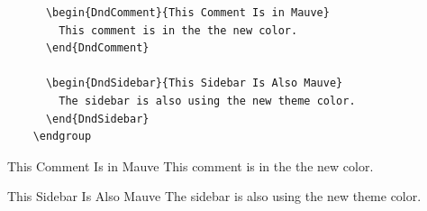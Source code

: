 \documentclass[letterpaper,openany,nodeprecatedcode]{dndbook}
\begin{document}
\begin{multicols}{2}
\begin{lstlisting}
      \begin{DndComment}{This Comment Is in Mauve}
        This comment is in the the new color.
      \end{DndComment}

      \begin{DndSidebar}{This Sidebar Is Also Mauve}
        The sidebar is also using the new theme color.
      \end{DndSidebar}
    \endgroup
  \end{lstlisting}

  \begingroup
    \DndSetThemeColor[PhbMauve]

    \begin{DndComment}{This Comment Is in Mauve}
      This comment is in the the new color.
    \end{DndComment}

    \begin{DndSidebar}{This Sidebar Is Also Mauve}
      The sidebar is also using the new theme color.
    \end{DndSidebar}
  \endgroup

  \end{multicols}
\end{document}
